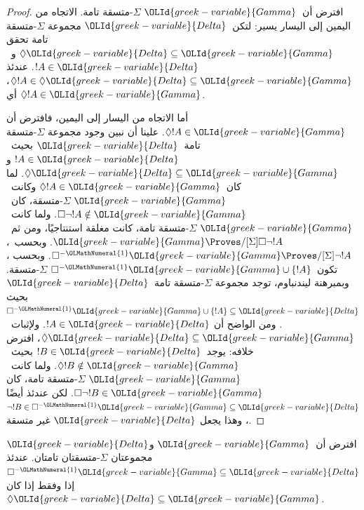 \documentclass[../../../include/open-logic-section]{subfiles}
\begin{document}
{\begin{proof}
  افترض أن~${\OLId{greek-variable}{Gamma}}$ $\Sigma$-متسقة تامة. الاتجاه من اليمين إلى اليسار
  يسير: لتكن~${\OLId{greek-variable}{Delta}}$ مجموعة $\Sigma$-متسقة تامة تحقق
  $\Diamond{\OLId{greek-variable}{Delta}} \subseteq {\OLId{greek-variable}{Gamma}}$ و~$!A \in {\OLId{greek-variable}{Delta}}$. عندئذ
  $\Diamond!A \in \Diamond{\OLId{greek-variable}{Delta}} \subseteq {\OLId{greek-variable}{Gamma}}$، أي
  $\Diamond!A \in {\OLId{greek-variable}{Gamma}}$.

  أما الاتجاه من اليسار إلى اليمين، فافترض أن
  $\Diamond !A \in {\OLId{greek-variable}{Gamma}}$. علينا أن نبين وجود مجموعة $\Sigma$-متسقة
  تامة~${\OLId{greek-variable}{Delta}}$ بحيث~$!A \in {\OLId{greek-variable}{Delta}}$ و
  $\Diamond{\OLId{greek-variable}{Delta}} \subseteq {\OLId{greek-variable}{Gamma}}$. لما كان~$\Diamond !A \in {\OLId{greek-variable}{Gamma}}$
  وكانت~${\OLId{greek-variable}{Gamma}}$ $\Sigma$-متسقة، كان~$\Box\lnot !A \notin {\OLId{greek-variable}{Gamma}}$.
  ولما كانت~${\OLId{greek-variable}{Gamma}}$ $\Sigma$-متسقة تامة، كانت مغلقة استنتاجيًا، ومن
  ثم~${\OLId{greek-variable}{Gamma}} \Proves/[\Sigma] \Box\lnot !A$. وبحسب~،
  $\Box^{-{\OLMathNumeral{1}}}{\OLId{greek-variable}{Gamma}} \Proves/[\Sigma] \lnot !A$. وبحسب
  ،
  تكون~$\Box^{-{\OLMathNumeral{1}}}{\OLId{greek-variable}{Gamma}} \cup \{!A\}$ $\Sigma$-متسقة. وبمبرهنة
  ليندنباوم، توجد مجموعة $\Sigma$-متسقة تامة~${\OLId{greek-variable}{Delta}}$ بحيث
  $\Box^{-{\OLMathNumeral{1}}}{\OLId{greek-variable}{Gamma}} \cup \{!A\} \subseteq {\OLId{greek-variable}{Delta}}$. ومن الواضح أن
  $!A \in {\OLId{greek-variable}{Delta}}$. ولإثبات~$\Diamond{\OLId{greek-variable}{Delta}} \subseteq {\OLId{greek-variable}{Gamma}}$، افترض
  خلافه: يوجد~$!B \in {\OLId{greek-variable}{Delta}}$ بحيث~$\Diamond !B \notin {\OLId{greek-variable}{Gamma}}$.
  ولما كانت~${\OLId{greek-variable}{Gamma}}$ $\Sigma$-متسقة تامة، كان
  $\Box\lnot !B \in {\OLId{greek-variable}{Gamma}}$. لكن عندئذ أيضًا
  $\lnot !B \in \Box^{-{\OLMathNumeral{1}}}{\OLId{greek-variable}{Gamma}} \subseteq {\OLId{greek-variable}{Delta}}$، وهذا يجعل
  ${\OLId{greek-variable}{Delta}}$ غير متسقة.
\end{proof}
}

\begin{lem}
  افترض أن~${\OLId{greek-variable}{Gamma}}$ و${\OLId{greek-variable}{Delta}}$ مجموعتان $\Sigma$-متسقتان تامتان. عندئذ
  $\Box^{-{\OLMathNumeral{1}}}{\OLId{greek-variable}{Gamma}} \subseteq {\OLId{greek-variable}{Delta}}$ إذا وفقط إذا كان
  $\Diamond{\OLId{greek-variable}{Delta}} \subseteq {\OLId{greek-variable}{Gamma}}$.
\end{lem}
\end{document}
